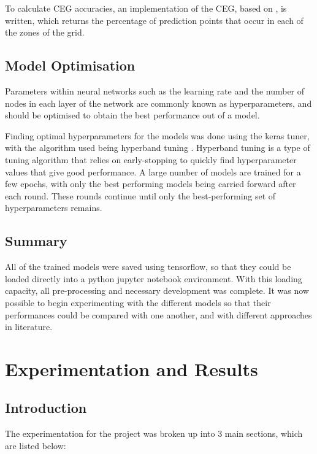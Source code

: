       To calculate CEG accuracies, an implementation of the CEG, based on \cite{cegcode}, is written, which returns the percentage of prediction points that occur in each of the zones of the grid. 

      \subsection{Model Optimisation}

        Parameters within neural networks such as the learning rate and the number of nodes in each layer of the network are commonly known as hyperparameters, and should be optimised to obtain the best performance out of a model.

        Finding optimal hyperparameters for the models was done using the keras tuner, with the algorithm used being hyperband tuning \cite{hyperband}. Hyperband tuning is a type of tuning algorithm that relies on early-stopping to quickly find hyperparameter values that give good performance. A large number of models are trained for a few epochs, with only the best performing models being carried forward after each round. These rounds continue until only the best-performing set of hyperparameters remains.
	
	\subsection{Summary}
        All of the trained models were saved using tensorflow, so that they could be loaded directly into a python jupyter notebook environment. With this loading capacity, all pre-processing and necessary development was complete. It was now possible to begin experimenting with the different models so that their performances could be compared with one another, and with different approaches in literature.


\section{Experimentation and Results} %
    \subsection{Introduction}
        
      The experimentation for the project was broken up into 3 main sections, which are listed below:

